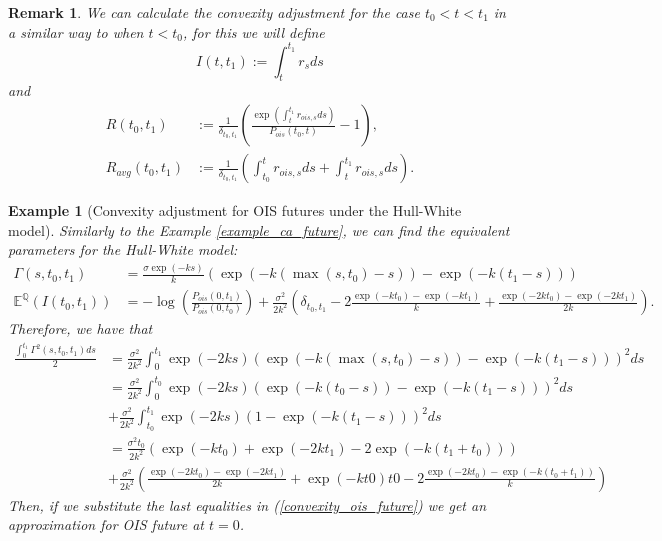 \documentclass[a4paper,10pt]{article}
\newtheorem{example}[theorem]{Example}
\newtheorem{remark}[theorem]{Remark}
\newcommand{\1}{\mathbf{1}}
\begin{document}
\begin{remark}
We can calculate the convexity adjustment for the case $t_0 < t < t_1$ in a similar way to when $t < t_0$, for this we will define
\begin{equation*}
I(t,t_1):=\int_{t}^{t_1} r_s ds
\end{equation*}
and 
\begin{align*}
R(t_0,t_1) &:= \frac{1}{\delta_{t_0,t_1}}\left(\frac{\exp(\int_{t}^{t_1} r_{ois,s} ds )}{P_{ois}(t_0,t)} - 1\right), \\
R_{avg}(t_0,t_1) &:= \frac{1}{\delta_{t_0,t_1}}\left(\int_{t_0}^{t} r_{ois,s} ds + \int_{t}^{t_1} r_{ois,s} ds\right).   
\end{align*}
\end{remark}

\begin{example}[Convexity adjustment for OIS futures under the Hull-White model]\label{example_convexity_hw_ois}
Similarly to the Example \ref{example_ca_future}, we can find the equivalent parameters for the Hull-White model: 
\begin{align*}
\Gamma(s,t_0,t_1) &= \frac{\sigma \exp(-ks)}{k}\left(\exp(-k(\max(s,t_0) - s)) - \exp(-k(t_1-s))\right)\\
\mathbb{E}^{\mathbb{Q}}\left(I(t_0,t_1)\right)&=-\log\left(\frac{P_{ois}(0,t_1)}{P_{ois}(0,t_0)}\right) + \frac{\sigma^{2}}{2k^{2}}\left(\delta_{t_0,t_1} - 2 \frac{\exp(-kt_0) - \exp(-kt_1)}{k} + \frac{\exp(-2kt_0) - \exp(-2kt_1)}{2k}  \right).
\end{align*}
Therefore, we have that
\begin{align*}
\frac{\int_{0}^{t_1} \Gamma^{2}(s,t_0,t_1) ds}{2} &= \frac{\sigma^{2}}{2k^2} \int_{0}^{t_1}  \exp(-2ks)\left(\exp(-k(\max(s,t_0) - s)) - \exp(-k(t_1 - s))\right)^{2} ds \\
&= \frac{\sigma^{2}}{2k^2} \int_{0}^{t_0} \exp(-2ks)\left(\exp(-k(t_0 - s)) - \exp(-k(t_1 - s))\right)^{2} ds\\
&+ \frac{\sigma^{2}}{2k^2} \int_{t_0}^{t_1} \exp(-2ks)\left(1 - \exp(-k(t_1 - s))\right)^{2} ds\\
&= \frac{\sigma^{2}t_0}{2k^{2}} \left( \exp(-kt_0) + \exp(-2kt_1) - 2 \exp(-k(t_1+t_0)) \right)\\  
&+ \frac{\sigma^{2}}{2k^{2}} \left(\frac{\exp(-2kt_0) - \exp(-2kt_1)}{2k}  + \exp(-kt0)t0 - 2 \frac{\exp(-2kt_0) - \exp(-k(t_0 + t_1))}{k}  \right)
\end{align*}
Then, if we substitute the last equalities in (\ref{convexity_ois_future}) we get an approximation for OIS future at $t=0$.\\


\end{example}
\end{document}
